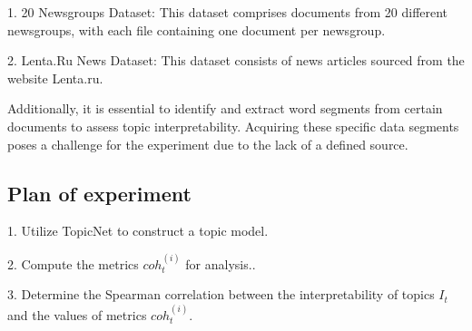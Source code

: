 \documentclass{article}
\begin{document}
1. 20 Newsgroups Dataset: This dataset comprises documents from 20 different newsgroups, with each file containing one document per newsgroup.

2. Lenta.Ru News Dataset: This dataset consists of news articles sourced from the website Lenta.ru.

Additionally, it is essential to identify and extract word segments from certain documents to assess topic interpretability. Acquiring these specific data segments poses a challenge for the experiment due to the lack of a defined source.

\subsection{Plan of experiment}

1. Utilize TopicNet to construct a topic model.

2. Compute the metrics $coh^{(i)}_t$  for analysis..

3. Determine the Spearman correlation between the interpretability of topics $I_t$ and the values of metrics $coh^{(i)}_t$.



\end{document}
